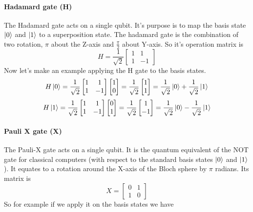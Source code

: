 \documentclass[main.tex]{subfiles}
\theoremstyle{definition}
\begin{document}
	\paragraph{Hadamard gate (H)} The Hadamard gate acts on a single qubit. It's purpose is to map the
	basis state $\ket{0}$  and $\ket{1}$ to a superposition state.
	The hadamard gate is the combination of two rotation, $\pi$ about the Z-axis and 
	$\frac{\pi}{2}$ about Y-axis. 
	So it's operation matrix is
	\begin{equation}
	H=\frac{1}{\sqrt{2}}
	\begin{bmatrix}
	1 & 1\\
	1 & -1
	\end{bmatrix}
	\end{equation}
	Now let's make an example applying the H gate to the basis states.
	\begin{equation}
	H\ket{0}=\frac{1}{\sqrt{2}}
	\begin{bmatrix}
	1 & 1\\
	1 & -1
	\end{bmatrix}
	\begin{bmatrix}
	1 \\
	0
	\end{bmatrix}
	=\frac{1}{\sqrt{2}}
	\begin{bmatrix}
	1 \\
	1
	\end{bmatrix}
	=
	\frac{1}{\sqrt{2}}\ket{0}+\frac{1}{\sqrt{2}}\ket{1}
	\end{equation}
	\begin{equation}
	H\ket{1}=\frac{1}{\sqrt{2}}
	\begin{bmatrix}
	1 & 1\\
	1 & -1
	\end{bmatrix}
	\begin{bmatrix}
	0 \\
	1
	\end{bmatrix}
	=\frac{1}{\sqrt{2}}
	\begin{bmatrix}
	1 \\
	-1
	\end{bmatrix}
	=
	\frac{1}{\sqrt{2}}\ket{0}-\frac{1}{\sqrt{2}}\ket{1}
	\end{equation}
	
	
	\paragraph{Pauli X gate (X)} The Pauli-X gate acts on a single qubit. It is the quantum equivalent of the NOT gate for classical 
	computers (with respect to the standard basis states $\ket{0}$ and $\ket{1}$).  It equates to a rotation around the X-axis of the
	Bloch sphere by $\pi$ radians. Its matrix is 
	\begin{equation}
	X=
	\begin{bmatrix}
	0 & 1\\
	1 & 0
	\end{bmatrix}
	\end{equation}
	So for example if we apply it on the basis states we have
	
\end{document}
